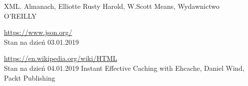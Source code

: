 \documentclass[12pt, twoside]{report}
\begin{document}
\begin{thebibliography}{9}
XML. Almanach, Elliotte Rusty Harold, W.Scott Means, Wydawnictwo O'REILLY

  \url{https://www.json.org/} \\
  Stan na dzień 03.01.2019

	\url{https://en.wikipedia.org/wiki/HTML} \\
	Stan na dzień 04.01.2019
Instant Effective Caching with Ehcache, Daniel Wind, Packt Publishing
\end{thebibliography}
\end{document}
